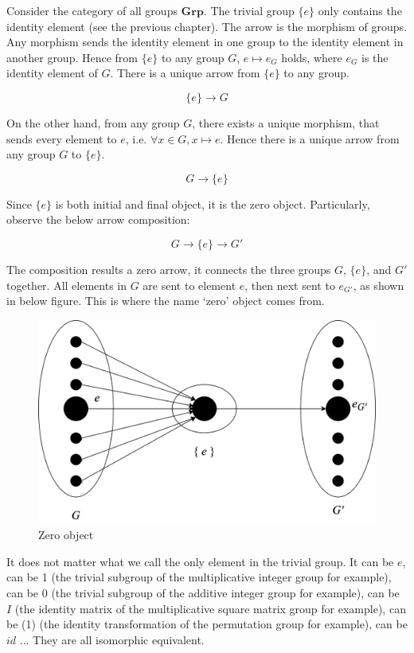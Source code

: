 \documentclass[b5paper]{article}
\begin{document}
\begin{example}
\normalfont
Consider the category of all groups $\pmb{Grp}$. The trivial group $\{e\}$ only contains the identity element (see the previous chapter). The arrow is the morphism of groups. Any morphism sends the identity element in one group to the identity element in another group. Hence from $\{e\}$ to any group $G$, $e \mapsto e_G$ holds, where $e_G$ is the identity element of $G$. There is a unique arrow from $\{e\}$ to any group.

\[
\{e\} \longrightarrow G
\]

On the other hand, from any group $G$, there exists a unique morphism, that sends every element to $e$, i.e. $\forall x \in G, x \mapsto e$. Hence there is a unique arrow from any group $G$ to $\{e\}$.

\[
G \longrightarrow \{e\}
\]

Since $\{e\}$ is both initial and final object, it is the zero object. Particularly, observe the below arrow composition:

\[
  G \longrightarrow \{e\} \longrightarrow G'
\]

The composition results a zero arrow, it connects the three groups $G$, $\{e\}$, and $G'$ together. All elements in $G$ are sent to element $e$, then next sent to $e_{G'}$, as shown in below figure. This is where the name `zero' object comes from.

\begin{figure}[htbp]
 \centering
 \includegraphics[scale=0.3]{img/01-obj}
 \caption{Zero object}
 \label{fig:zero-obj}
\end{figure}

It does not matter what we call the only element in the trivial group. It can be $e$, can be 1 (the trivial subgroup of the multiplicative integer group for example), can be 0 (the trivial subgroup of the additive integer group for example), can be $I$ (the identity matrix of the multiplicative square matrix group for example), can be (1) (the identity transformation of the permutation group for example), can be $id$ ... They are all isomorphic equivalent.
\end{example}
\end{document}
